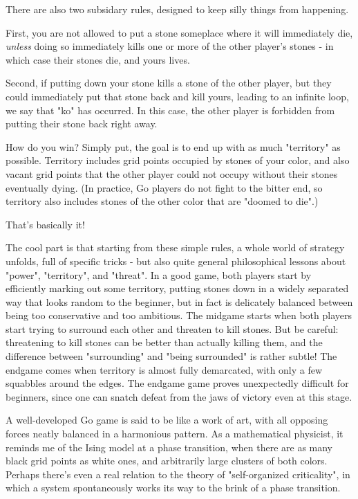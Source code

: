 There are also two subsidary rules, designed to keep silly things from
happening.  

First, you are not allowed to put a stone someplace where it will
immediately die, \emph{unless} doing so immediately kills one or more of the
other player's stones - in which case their stones die, and yours lives.
 
Second, if putting down your stone kills a stone of the other player, but
they could immediately put that stone back and kill yours, leading to an
infinite loop, we say that "ko" has occurred.  In this case, the other
player is forbidden from putting their stone back right away.  

How do you win?  Simply put, the goal is to end up with as much
"territory" as possible.  Territory includes grid points occupied by
stones of your color, and also vacant grid points that the other player
could not occupy without their stones eventually dying.  (In practice, 
Go players do not fight to the bitter end, so territory also includes
stones of the other color that are "doomed to die".)

That's basically it!

The cool part is that starting from these simple rules, a whole world of
strategy unfolds, full of specific tricks - but also quite general
philosophical lessons about "power", "territory", and "threat".  In a
good game, both players start by efficiently marking out some territory,
putting stones down in a widely separated way that looks random to the 
beginner, but in fact is delicately balanced between being too
conservative and too ambitious.  The midgame starts when both players
start trying to surround each other and threaten to kill stones.   But
be careful: threatening to kill stones can be better than actually
killing them, and the difference between "surrounding" and "being
surrounded" is rather subtle!   The endgame comes when territory is
almost fully demarcated, with only a few squabbles around the edges.  
The endgame game proves unexpectedly difficult for beginners, since 
one can snatch defeat from the jaws of victory even at this stage.

A well-developed Go game is said to be like a work of art, with all
opposing forces neatly balanced in a harmonious pattern.  As a
mathematical physicist, it reminds me of the Ising model at a phase
transition, when there are as many black grid points as white ones, and
arbitrarily large clusters of both colors.  Perhaps there's even a
real relation to the theory of "self-organized criticality", in which
a system spontaneously works its way to the brink of a phase transition.

